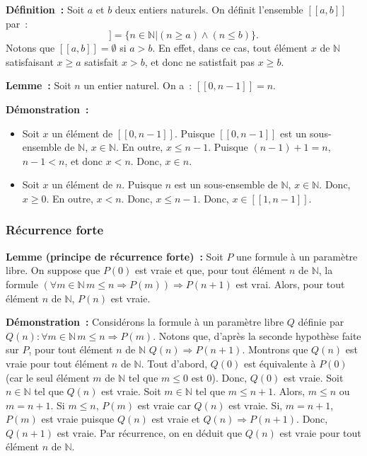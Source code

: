    \done 

\medskip

\noindent\textbf{Définition :} Soit $a$ et $b$ deux entiers naturels. 
    On définit l'ensemble $[\![a, b]\!]$ par : 
    \begin{equation*}
        [\![a, b]\!] = \lbrace n \in \mathbb{N} \vert (n \geq a) \wedge (n \leq b) \rbrace.
    \end{equation*}
    Notons que $[\![a, b]\!] = \emptyset$ si $a > b$. 
    En effet, dans ce cas, tout élément $x$ de $\mathbb{N}$ satisfaisant $x \geq a$ satisfait $x > b$, et donc ne satistfait pas $x \geq b$.

\medskip

\noindent\textbf{Lemme :} Soit $n$ un entier naturel. 
    On a : $[\![0, n-1]\!] = n$.

\medskip

\noindent\textbf{Démonstration :} 
\begin{itemize}[nosep]
    \item Soit $x$ un élément de $[\![0, n-1]\!]$. 
        Puisque $[\![0, n-1]\!]$ est un sous-ensemble de $\mathbb{N}$, $x \in \mathbb{N}$. 
        En outre, $x \leq n-1$.
        Puisque $(n-1)+1 = n$, $n-1 < n$, et donc $x < n$. 
        Donc, $x \in n$.
    \item Soit $x$ un élément de $n$. 
        Puisque $n$ est un sous-ensemble de $\mathbb{N}$, $x \in \mathbb{N}$. 
        Donc, $x \geq 0$.
        En outre, $x < n$.
        Donc, $x \leq n-1$. 
        Donc, $x \in [\![1,n-1]\!]$.
\end{itemize}

\done

\subsubsection{Récurrence forte}

\noindent\textbf{Lemme (principe de récurrence forte) :} Soit $P$ une formule à un paramètre libre. 
    On suppose que $P(0)$ est vraie et que, pour tout élément $n$ de $\mathbb{N}$, la formule $(\forall m \in \mathbb{N} \, m \leq n \Rightarrow P(m)) \Rightarrow P(n+1)$ est vrai. 
    Alors, pour tout élément $n$ de $\mathbb{N}$, $P(n)$ est vraie. 

\medskip

\noindent\textbf{Démonstration :} Considérons la formule à un paramètre libre $Q$ définie par $Q(n): \forall m \in \mathbb{N} \, m \leq n \Rightarrow P(m)$. 
    Notons que, d'après la seconde hypothèse faite sur $P$, pour tout élément $n$ de $\mathbb{N}$ $Q(n) \Rightarrow P(n+1)$.
    Montrons que $Q(n)$ est vraie pour tout élément $n$ de $\mathbb{N}$. 
    Tout d'abord, $Q(0)$ est équivalente à $P(0)$ (car le seul élément $m$ de $\mathbb{N}$ tel que $m \leq 0$ est $0$). 
    Donc, $Q(0)$ est vraie. 
    Soit $n \in \mathbb{N}$ tel que $Q(n)$ est vraie. 
    Soit $m \in \mathbb{N}$ tel que $m \leq n+1$. 
    Alors, $m \leq n$ ou $m = n+1$. 
    Si $m \leq n$, $P(m)$ est vraie car $Q(n)$ est vraie.
    Si, $m = n+1$, $P(m)$ est vraie puisque $Q(n)$ est vraie et $Q(n) \Rightarrow P(n+1)$. 
    Donc, $Q(n+1)$ est vraie.
    Par récurrence, on en déduit que $Q(n)$ est vraie pour tout élément $n$ de $\mathbb{N}$.

